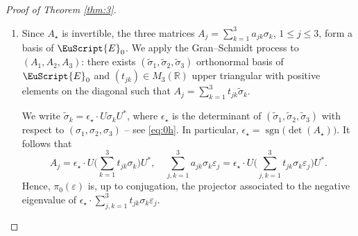 \documentclass[10pt]{amsart}
\let\pazocal\EuScript
\theoremstyle{definition}
\DeclareMathOperator{\sgn}{sgn}
\DeclareMathOperator{\Tr}{Tr}
\newcommand{\EE}{\pazocal{E}}
\newcommand{\C}{\mathbb{C}}
\newcommand{\R}{\mathbb{R}}
\let\epsi\varepsilon
\let\p\partial
\newcommand{\tsigma}{{\tilde{\sigma}}}
\begin{document}
\begin{proof}[Proof of Theorem \ref{thm:3}]
\begin{enumerate}
For $\epsi \neq 0$, the matrix $\sum_{j, k=1}^3 a_{jk} \sigma_k \epsi_j$ has two opposite, distinct eigenvalues. Let $\pi_0(\epsi)$ be the projector to the negative eigenvalue. Then
\begin{align*}
\pi(\zeta_\star+\epsi) &= \pi_0(\epsi) + O(|\epsi|), & \nabla\pi(\zeta_\star+\epsi) &= \nabla\pi_0(\epsi) + O(1),
\\
\nabla\pi(\zeta_\star+\epsi) &= O(|\epsi|^{-1}), & \nabla\pi_0(\zeta_\star+\epsi) &= O(|\epsi|^{-1}).
\end{align*}
We refer to the proof of \cite[Lem.\,2.4]{D19b} for such estimates. It follows that
\begin{equation*}
	b(\zeta_\star+\epsi) = b_0(\epsi) + O(|\epsi|^{-1}), \quad \text{where} \ \ b_0(\epsi) = \Tr_{\C^N} \left( \pi_0(\epsi) \bigl[ \p_{\xi_1} \pi_0(\epsi), \p_{\xi_2} \pi_0(\epsi) \bigr]\right).
\end{equation*}
Grouping with \eqref{eq:0l}, we obtain $B_n(\zeta_\star+\epsi) = b_0(\epsi) + O(|\epsi|^{-1})$. In particular,
\begin{equation}\label{eq:0o}
\begin{split}
\int_{|\xi-\xi_\star| \leq r}\hspace*{-2mm} B_n(s_\star\pm\delta,\xi) d\xi &= \int_{|\xi-\xi_\star| \leq r}\hspace*{-2mm} b_0(\pm\delta,\xi-\xi_\star) d\xi + O\biggl(\int_{|\xi-\xi_\star| \leq r} \dfrac{1}{|\xi-\xi_\star|} d\xi\biggr)
\\
&= \int_{|\xi| \leq r} b_0(\pm\delta,\xi) d\xi + O(r).
\end{split}
\end{equation}

\item
Since $A_\star$ is invertible, the three matrices $A_j = \sum_{k=1}^3 a_{jk} \sigma_k$, $1 \leq j \leq 3$, form a basis of $\EE_0$. We apply the Gran--Schmidt process to $(A_1, A_2, A_3)$: there exists $(\tsigma_1,\tsigma_2,\tsigma_3)$ orthonormal basis of $\EE_0$ and $(t_{jk}) \in M_3(\R)$ upper triangular with positive elements on the diagonal such that $A_j = \sum_{k=1}^3 t_{jk} \tsigma_k$.

We write $\tsigma_k = \epsilon_\star \cdot U \sigma_k U^*$, where $\epsilon_\star$ is the determinant of $(\tsigma_1,\tsigma_2,\tsigma_3)$ with respect to $(\sigma_1,\sigma_2,\sigma_3)$ -- see \eqref{eq:0h}. In particular, $\epsilon_\star = \sgn\bigl( \det(A_\star)\bigr)$. It follows that
\begin{equation*}
A_j = \epsilon_\star \cdot U \biggl(\sum_{k=1}^3 t_{jk} \sigma_k\biggr) U^*, \quad \sum_{j, k=1}^3 a_{jk} \sigma_k \epsi_j = \epsilon_\star \cdot U \biggl(\sum_{j, k=1}^3 t_{jk} \sigma_k \epsi_j \biggr) U^*.
\end{equation*}
Hence, $\pi_0(\epsi)$ is, up to conjugation, the projector associated to the negative eigenvalue of $\epsilon_\star \cdot \sum_{j, k=1}^3 t_{jk} \sigma_k \epsi_j$.


\end{enumerate}
\end{proof}
\end{document}
